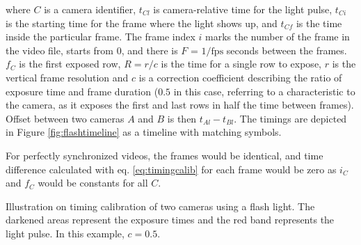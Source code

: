where $C$ is a camera identifier, $t_{Cl}$ is camera-relative time for the light pulse, $t_{Ci}$ is the starting time for the frame where the light shows up, and $t_{Cf}$ is the time inside the particular frame.
The frame index $i$ marks the number of the frame in the video file, starts from 0, and there is $F$ = $1/\text{fps}$ seconds between the frames.
$f_C$ is the first exposed row, $R = r / c$ is the time for a single row to expose, $r$ is the vertical frame resolution and $c$ is a correction coefficient describing the ratio of exposure time and frame duration ($0.5$ in this case, referring to a characteristic to the camera, as it exposes the first and last rows in half the time between frames).
Offset between two cameras $A$ and $B$ is then $t_{Al} - t_{Bl}$.
The timings are depicted in Figure \ref{fig:flashtimeline} as a timeline with matching symbols.

For perfectly synchronized videos, the frames would be identical, and time difference calculated with eq. \ref{eq:timingcalib} for each frame would be zero as $i_C$ and $f_C$ would be constants for all $C$.

{Illustration on timing calibration of two cameras using a flash light.
The darkened areas represent the exposure times and the red band represents the light pulse.
In this example, $c = 0.5$.
}




